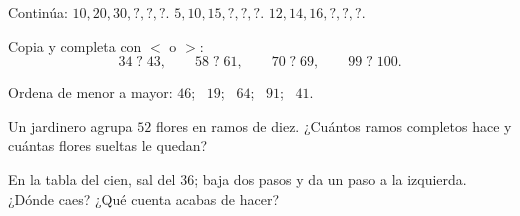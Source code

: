 \begin{exercise}[$\star$]\label{exo:g1:tens:5}
Continúa: $10, 20, 30, ?, ?, ?$. \quad
$5, 10, 15, ?, ?, ?$. \quad $12, 14, 16, ?, ?, ?$.
\end{exercise}

\begin{exercise}[$\star$]\label{exo:g1:tens:6}
Copia y completa con $<$ o $>$:
\[
34 \;?\; 43, \qquad
58 \;?\; 61, \qquad
70 \;?\; 69, \qquad
99 \;?\; 100 .
\]
\end{exercise}

\begin{exercise}[$\star$]\label{exo:g1:tens:7}
Ordena de menor a mayor: $46$; \ $19$; \ $64$; \ $91$; \
$41$.
\end{exercise}

\begin{exercise}[$\star$]\label{exo:g1:tens:8}
Un jardinero agrupa $52$ flores en ramos de diez. ¿Cuántos ramos
completos hace y cuántas flores sueltas le quedan?
\end{exercise}

\begin{exercise}[$\star\star$]\label{exo:g1:tens:9}
En la tabla del cien, sal del $36$; baja dos pasos y da un paso a la
izquierda. ¿Dónde caes? ¿Qué cuenta acabas de hacer?
\end{exercise}

